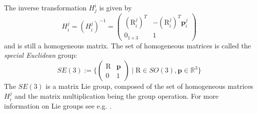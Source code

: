 \documentclass[a4paper,twoside, openright,12pt]{report}
\newcommand{\f}[1]{\boldsymbol{#1}}
\newcommand{\g}[1]{\text{#1}}
\begin{document}
The inverse transformation $ H_j^i $ is given by 
\[H_i^j = (H_i^j)^{-1} = \begin{pmatrix}(\g{R}_i^j)^T & -(\g{R}_i^j)^T \f{p}_i^j \\ 0_{1 \times 3} & 1\end{pmatrix} \]
and is still a homogeneous matrix.
The set of homogeneous matrices is called the \emph{special Euclidean} group:
\begin{equation}
	SE(3) := \{\begin{pmatrix}\g{R} & \f{p}\\0 & 1\end{pmatrix} \; | \; \g{R} \in SO(3), \f{p} \in \mathbb{R}^3\} 
\end{equation}
The $SE(3)$ is a matrix Lie group, composed of the set of homogeneous matrices $H_i^j$ and the matrix multiplication being the group operation. For more information on Lie groups see e.g. \cite{Stramigioli_01}.
\end{document}
